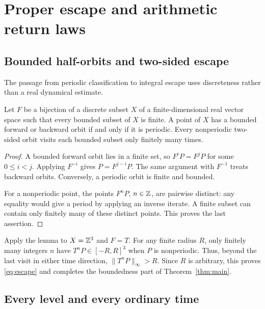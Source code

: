 \section{Proper escape and arithmetic return laws}\label{sec:levels}

\subsection{Bounded half-orbits and two-sided escape}

The passage from periodic classification to integral escape uses
discreteness rather than a real dynamical estimate.

\begin{lemma}\label{lem:discrete}
Let $F$ be a bijection of a discrete subset $X$ of a finite-dimensional
real vector space such that every bounded subset of $X$ is finite.
A point of $X$ has a bounded forward or backward orbit if and only
if it is periodic. Every nonperiodic two-sided orbit visits each bounded
subset only finitely many times.
\end{lemma}
\begin{proof}
A bounded forward orbit lies in a finite set, so $F^iP=F^jP$
for some $0\leq i<j$. Applying $F^{-i}$ gives
$P=F^{j-i}P$. The same argument with $F^{-1}$ treats backward
orbits. Conversely, a periodic orbit is finite and bounded.

For a nonperiodic point, the points $F^nP$, $n\in\mathbb Z$, are
pairwise distinct: any equality would give a period by applying an
inverse iterate. A finite subset can contain only finitely many of
these distinct points. This proves the last assertion.
\end{proof}

Apply the lemma to $X=\mathbb Z^3$ and $F=T$. For any finite radius
$R$, only finitely many integers $n$ have
$T^nP\in[-R,R]^3$ when $P$ is nonperiodic. Thus, beyond the
last visit in either time direction, $\|T^nP\|_\infty>R$.
Since $R$ is arbitrary, this proves \eqref{eq:escape} and completes
the boundedness part of Theorem~\ref{thm:main}.

\subsection{Every level and every ordinary time}


